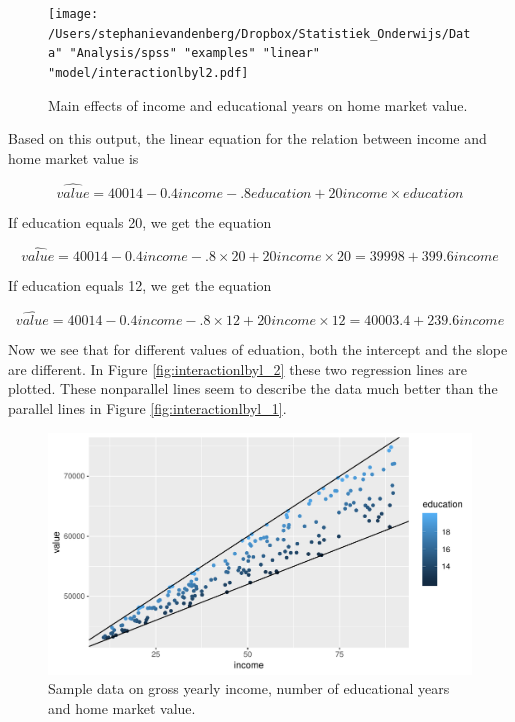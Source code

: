 \documentclass[]{report}\usepackage[]{graphicx}\usepackage[]{color}
\makeatletter
\def\maxwidth{ %
  \ifdim\Gin@nat@width>\linewidth
    \linewidth
  \else
    \Gin@nat@width
  \fi
}
\makeatother
\begin{document}
\begin{figure}[h]
    \begin{center}
       \texttt{[image: /Users/stephanievandenberg/Dropbox/Statistiek\_Onderwijs/Data" "Analysis/spss" "examples"  "linear" "model/interactionlbyl2.pdf]}
    \end{center}
    \label{fig:interactionlbyl2}
    \caption{Main effects of income and educational years on home market value.}
\end{figure}

Based on this output, the linear equation for the relation between income and home market value is 

\begin{equation}
\widehat{value}= 40014 -0.4 income -.8 education + 20 income \times education
\end{equation}

If education equals 20, we get the equation

\begin{equation}
\widehat{value}= 40014 -0.4 income -.8 \times 20 + 20 income \times 20 = 39998 + 399.6 income
\end{equation}

If education equals 12, we get the equation 

\begin{equation}
\widehat{value}= 40014 - 0.4 income -.8 \times 12 + 20 income \times 12 = 40003.4 + 239.6 income
\end{equation}

Now we see that for different values of eduation, both the intercept and the slope are different. In Figure \ref{fig:interactionlbyl_2} these two regression lines are plotted. These nonparallel lines seem to describe the data much better than the parallel lines in Figure \ref{fig:interactionlbyl_1}. 

\begin{figure}

{\centering \includegraphics[width=\maxwidth]{figure/linearbylinear_2-1} 

}

\caption[Sample data on gross yearly income, number of educational years and home market value]{Sample data on gross yearly income, number of educational years and home market value.}\label{fig:linearbylinear_2}
\end{figure}
\end{document}
